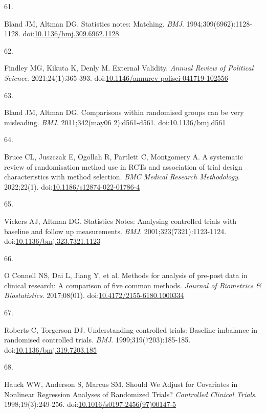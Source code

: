 \documentclass[
]{book}
\newlength{\cslhangindent}
\newlength{\csllabelwidth}
\newlength{\cslentryspacingunit} %
\newenvironment{CSLReferences}[2] %
 {%
  \setlength{\parindent}{0pt}
  \ifodd #1
  \let\oldpar\par
  \def\par{\hangindent=\cslhangindent\oldpar}
  \fi
  \setlength{\parskip}{#2\cslentryspacingunit}
 }%
 {}
\newcommand{\CSLLeftMargin}[1]{\parbox[t]{\csllabelwidth}{#1}}
\newcommand{\CSLRightInline}[1]{\parbox[t]{\linewidth - \csllabelwidth}{#1}\break}
\begin{document}
\begin{CSLReferences}{0}{0}
\leavevmode{}%
\CSLLeftMargin{61. }%
\CSLRightInline{Bland JM, Altman DG. Statistics notes: Matching. \emph{BMJ}. 1994;309(6962):1128-1128. doi:\href{https://doi.org/10.1136/bmj.309.6962.1128}{10.1136/bmj.309.6962.1128}}

\leavevmode{}%
\CSLLeftMargin{62. }%
\CSLRightInline{Findley MG, Kikuta K, Denly M. External Validity. \emph{Annual Review of Political Science}. 2021;24(1):365-393. doi:\href{https://doi.org/10.1146/annurev-polisci-041719-102556}{10.1146/annurev-polisci-041719-102556}}

\leavevmode{}%
\CSLLeftMargin{63. }%
\CSLRightInline{Bland JM, Altman DG. Comparisons within randomised groups can be very misleading. \emph{BMJ}. 2011;342(may06 2):d561-d561. doi:\href{https://doi.org/10.1136/bmj.d561}{10.1136/bmj.d561}}

\leavevmode{}%
\CSLLeftMargin{64. }%
\CSLRightInline{Bruce CL, Juszczak E, Ogollah R, Partlett C, Montgomery A. A systematic review of randomisation method use in RCTs and association of trial design characteristics with method selection. \emph{BMC Medical Research Methodology}. 2022;22(1). doi:\href{https://doi.org/10.1186/s12874-022-01786-4}{10.1186/s12874-022-01786-4}}

\leavevmode{}%
\CSLLeftMargin{65. }%
\CSLRightInline{Vickers AJ, Altman DG. Statistics Notes: Analysing controlled trials with baseline and follow up measurements. \emph{BMJ}. 2001;323(7321):1123-1124. doi:\href{https://doi.org/10.1136/bmj.323.7321.1123}{10.1136/bmj.323.7321.1123}}

\leavevmode{}%
\CSLLeftMargin{66. }%
\CSLRightInline{O Connell NS, Dai L, Jiang Y, et al. Methods for analysis of pre-post data in clinical research: A comparison of five common methods. \emph{Journal of Biometrics \& Biostatistics}. 2017;08(01). doi:\href{https://doi.org/10.4172/2155-6180.1000334}{10.4172/2155-6180.1000334}}

\leavevmode{}%
\CSLLeftMargin{67. }%
\CSLRightInline{Roberts C, Torgerson DJ. Understanding controlled trials: Baseline imbalance in randomised controlled trials. \emph{BMJ}. 1999;319(7203):185-185. doi:\href{https://doi.org/10.1136/bmj.319.7203.185}{10.1136/bmj.319.7203.185}}

\leavevmode{}%
\CSLLeftMargin{68. }%
\CSLRightInline{Hauck WW, Anderson S, Marcus SM. Should We Adjust for Covariates in Nonlinear Regression Analyses of Randomized Trials? \emph{Controlled Clinical Trials}. 1998;19(3):249-256. doi:\href{https://doi.org/10.1016/s0197-2456(97)00147-5}{10.1016/s0197-2456(97)00147-5}}


\end{CSLReferences}
\end{document}
